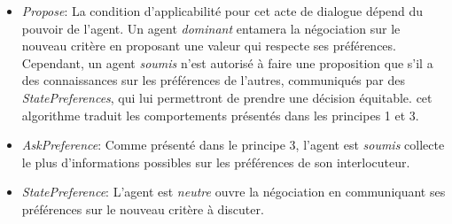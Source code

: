 			\begin{itemize}
				\item \emph{Propose}: La condition d'applicabilité pour cet acte de dialogue dépend du pouvoir de l'agent. Un agent \emph{dominant} entamera la négociation sur le nouveau critère en proposant une valeur qui respecte ses préférences. Cependant, un agent \emph{soumis} n'est autorisé à faire une proposition que s'il a des connaissances sur les préférences de l'autres,  communiqués par des \emph{StatePreferences}, qui lui permettront de prendre une décision équitable. cet algorithme traduit les comportements présentés dans les principes 1 et 3. 
				
				\item \emph{AskPreference}: Comme présenté dans le principe 3, l'agent est \emph{soumis} collecte le plus d'informations possibles sur les préférences de son interlocuteur. 
				\item \emph{StatePreference}: L'agent est \emph{neutre} ouvre la négociation en communiquant ses préférences sur le nouveau critère à discuter. 
				
			\end{itemize}
			
%						
%				
				
